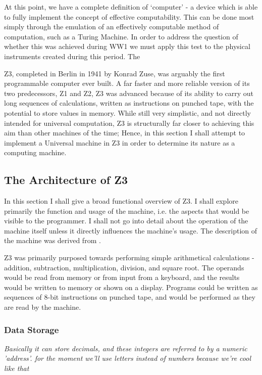\documentclass[Master.tex]{subfiles}
\begin{document}
At this point, we have a complete definition of `computer' - a device which is able to fully implement the concept of effective computability. This can be done most simply through the emulation of an effectively computable method of computation, such as a Turing Machine. In order to address the question of whether this was achieved during WW1 we must apply this test to the physical instruments created during this period. The 

Z3, completed in Berlin in 1941 by Konrad Zuse, was arguably the first programmable computer ever built. A far faster and more reliable version of its two predecessors, Z1 and Z2, Z3 was advanced because of its ability to carry out long sequences of calculations, written as instructions on punched tape, with the potential to store values in memory. While still very simplistic, and not directly intended for universal computation, Z3 is structurally far closer to achieving this aim than other machines of the time; Hence, in this section I shall attempt to implement a Universal machine in Z3 in order to determine its nature as a computing machine.

\subsection{The Architecture of Z3}

In this section I shall give a broad functional overview of Z3. I shall explore primarily the function and usage of the machine, i.e. the aspects that would be visible to the programmer. I shall not go into detail about the operation of the machine itself unless it directly influences the machine's usage. The description of the machine was derived from \cite{rojas1997z3architecture}.

Z3 was primarily purposed towards performing simple arithmetical calculations - addition, subtraction, multiplication, division, and square root. The operands would be read from memory or from input from a keyboard, and the results would be written to memory or shown on a display. Programs could be written as sequences of 8-bit instructions on punched tape, and would be performed as they are read by the machine.

  
\subsubsection{Data Storage}

\textit{Basically it can store decimals, and these integers are referred to by a numeric 'address'. for the moment we'll use letters instead of numbers because we're cool like that}
\end{document}
